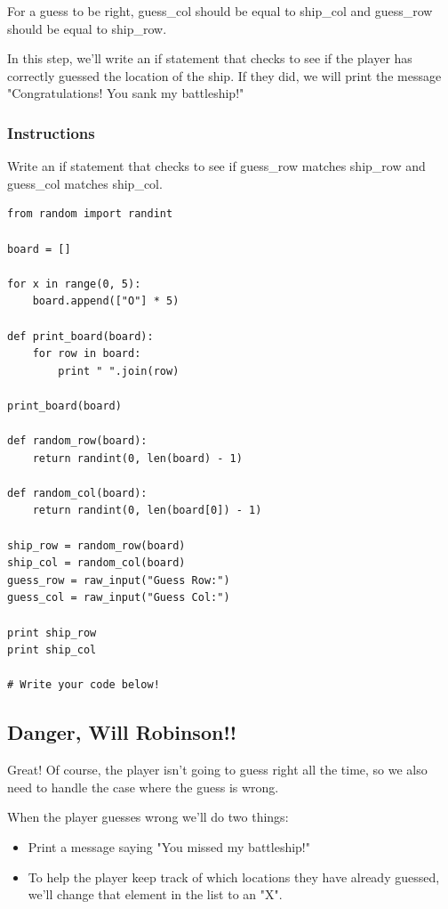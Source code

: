 \documentclass[12pt,a4paper,final,twoside,onecolumn,titlepage]{book}
\begin{document}
For a guess to be right, guess\_col should be equal to ship\_col and guess\_row should be equal to ship\_row.

In this step, we'll write an if statement that checks to see if the player has correctly guessed the location of the ship. If they did, we will print the message "Congratulations! You sank my battleship!"
\subsubsection{Instructions}

Write an if statement that checks to see if guess\_row matches ship\_row and guess\_col matches ship\_col.
\begin{lstlisting}
from random import randint

board = []

for x in range(0, 5):
    board.append(["O"] * 5)

def print_board(board):
    for row in board:
        print " ".join(row)

print_board(board)

def random_row(board):
    return randint(0, len(board) - 1)

def random_col(board):
    return randint(0, len(board[0]) - 1)

ship_row = random_row(board)
ship_col = random_col(board)
guess_row = raw_input("Guess Row:")
guess_col = raw_input("Guess Col:")

print ship_row
print ship_col

# Write your code below!

\end{lstlisting}

\subsection{Danger, Will Robinson!!}

Great! Of course, the player isn't going to guess right all the time, so we also need to handle the case where the guess is wrong.

When the player guesses wrong we'll do two things:
\begin{itemize}
\item    Print a message saying "You missed my battleship!"
\item    To help the player keep track of which locations they have already guessed, we'll change that element in the list to an "X".
\end{itemize}
\end{document}
